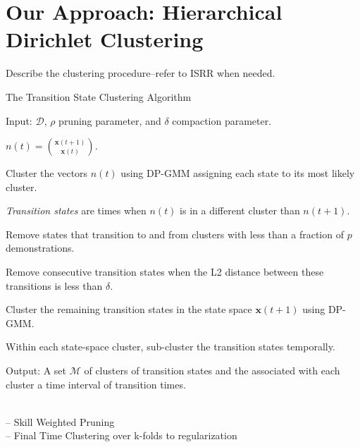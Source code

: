 \section{Our Approach: Hierarchical Dirichlet  Clustering}
Describe the clustering procedure--refer to ISRR when needed.

\begin{algorithm}[t]
\caption{The Transition State Clustering Algorithm  \label{algotext}}
\begin{algorithmic}[1]
\scriptsize
\State \textsf{Input: } $\mathcal{D}$, $\rho$ pruning parameter, and $\delta$ compaction parameter.

\State $n(t) = \binom{\mathbf{x}(t+1)}{\mathbf{x}(t)}$. 

\State Cluster the vectors $n(t)$ using DP-GMM assigning each state to its most likely cluster. 

\State \emph{Transition states} are times when $n(t)$ is in a different cluster than $n(t+1)$. 

\State Remove states that transition to and from clusters with less than a fraction of $p$ demonstrations. 

\State Remove consecutive transition states when the L2 distance between these transitions is less than $\delta$. 

\State Cluster the remaining transition states in the state space $\mathbf{x}(t+1)$ using DP-GMM.

\State Within each state-space cluster, sub-cluster the transition states temporally. 

\State \textsf{Output: } A set $\mathcal{M}$ of clusters of transition states and the associated with each cluster a time interval of transition times.
\end{algorithmic}
\end{algorithm}

\noindent {}\\
-- Skill Weighted Pruning\\
-- Final Time Clustering over k-folds to regularization

